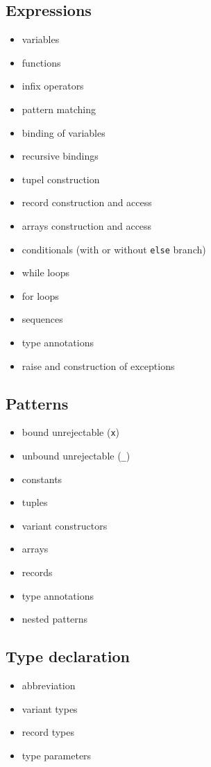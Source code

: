 \documentclass{article}
\begin{document}
\subsection{Expressions}

\begin{multicols}{2}
\begin{itemize}
  \item variables
  \item functions
  \item infix operators
  \item pattern matching
  \item binding of variables
  \item recursive bindings
  \item tupel construction
  \item record construction and access
  \item arrays construction and access
  \item conditionals (with or without \texttt{else} branch)
  \item while loops
  \item for loops
  \item sequences
  \item type annotations
  \item raise and construction of exceptions
\end{itemize}
\end{multicols}

\subsection{Patterns}

\begin{multicols}{2}
\begin{itemize}
  \item bound unrejectable (\texttt{x}) 
  \item unbound unrejectable (\texttt{\_})
  \item constants
  \item tuples
  \item variant constructors
  \item arrays
  \item records
  \item type annotations
  \item nested patterns
\end{itemize}
\end{multicols}

\subsection{Type declaration}

\begin{multicols}{2}
\begin{itemize}
  \item abbreviation
  \item variant types
  \item record types
  \item type parameters
\end{itemize}
\end{multicols}
\end{document}
